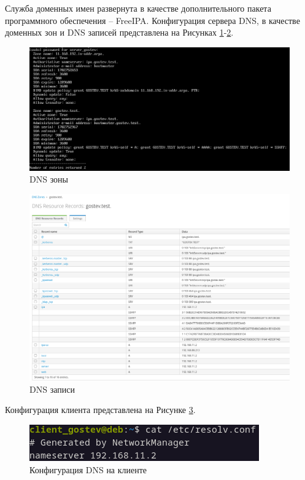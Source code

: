 \documentclass[14pt, a4paper]{extarticle}
\numberwithin{equation}{section}
\begin{document}
Служба доменных имен развернута в качестве дополнительного пакета программного обеспечения -- FreeIPA.
Конфигурация сервера DNS, в качестве доменных зон и DNS записей представлена на Рисунках \ref{fig:dnszones}-\ref{fig:dnsrecords}. 

\begin{figure}[H]
        \centering
        \includegraphics[scale=0.7]{services/dns/dnszones.png}
        \caption{DNS зоны}
        \label{fig:dnszones}
\end{figure}

\begin{figure}[H]
        \centering
        \includegraphics[scale=0.7]{services/dns/dns_records.png}
        \caption{DNS записи}
        \label{fig:dnsrecords}
\end{figure}

Конфигурация клиента представлена на Рисунке \ref{dns_client_setup}.
\begin{figure}[H]
        \centering
        \includegraphics[scale=1.2]{services/dns/client_dns_setup.png}
        \caption{Конфигурация DNS на клиенте}
        \label{dns_client_setup}
\end{figure}
\end{document}
